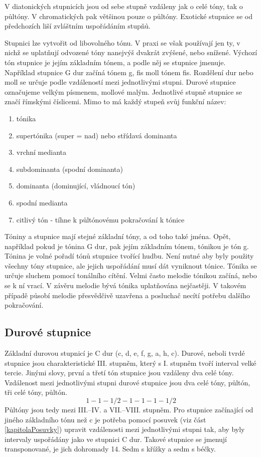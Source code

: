 V diatonických stupnicích jsou od sebe stupně vzdáleny jak o celé tóny, tak o půltóny.
V chromatických pak většinou pouze o půltóny.
Exotické stupnice se od předchozích liší zvláštním uspořádáním stupňů.
\cite{kofron}
\par

Stupnici lze vytvořit od libovolného tónu.
V praxi se však používají jen ty, 
v nichž se uplatňují odvozené tóny nanejvýš dvakrát zvýšené, nebo snížené.
Výchozí tón stupnice je jejím základním tónem, a podle něj se stupnice jmenuje.
Například stupnice G dur začíná tónem g, fis moll tónem fis.
Rozdělení dur nebo moll se určuje podle vzdáleností mezi jednotlivými stupni.
\cite{zenkl}
Durové stupnice označujeme velkým písmenem, mollové malým.
Jednotlivé stupně stupnice se značí římskými číslicemi.
Mimo to má každý stupeň svůj funkční název:
\cite{kofron}

\begin{enumerate} [label=\Roman*]
    \item tónika
    \item supertónika (super = nad) nebo střídavá dominanta
    \item vrchní medianta
    \item subdominanta (spodní dominanta)
    \item dominanta (dominující, vládnoucí tón)
    \item spodní medianta
    \item citlivý tón - tíhne k půltónovému pokračování k tónice
\end{enumerate}
\par

Tóniny a stupnice mají stejné základní tóny, a od toho také jména.
Opět, například pokud je tónina G dur, pak jejím základním tónem, tónikou je tón g.
Tónina je volné pořadí tónů stupnice tvořící hudbu.
Není nutné aby byly použity všechny tóny stupnice, 
ale jejich uspořádání musí dát vyniknout tónice.
Tónika se určuje sluchem pomocí tonálního cítění.
Velmi často melodie tónikou začíná, nebo se k ní vrací.
V závěru melodie bývá tónika uplatňována nejčastěji.
V takovém případě působí melodie přesvědčivě uzavřena 
a posluchač necítí potřebu dalšího pokračování.
\cite{zenkl}
\par

\subsection{Durové stupnice}
Základní durovou stupnicí je C dur (c, d, e, f, g, a, h, c).
Durové, neboli tvrdé stupnice jsou charakteristické III. stupněm,
který s I. stupněm tvoří interval velké tercie.
Jinými slovy, první a třetí tón stupnice jsou vzdáleny dva celé tóny.
Vzdálenost mezi jednotlivými stupni durové stupnice jsou dva celé tóny, 
půltón, tři celé tóny, půltón.
$$ 1 - 1 - 1/2 - 1 - 1 - 1 - 1/2 $$
Půltóny jsou tedy mezi III.--IV. a VII.--VIII. stupněm.
Pro stupnice začínající od jiného základního tónu než c 
je potřeba pomocí posuvek (viz část \ref{kapitolaPosuvky}) 
upravit vzdálenosti mezi jednotlivými stupni tak,
aby byly intervaly uspořádány jako ve stupnici C dur.
Takové stupnice  se jmenují transponované, je jich dohromady 14.
Sedm s křížky a sedm s béčky.
\cite{kofron}
\par

